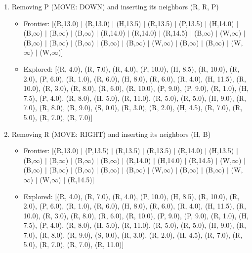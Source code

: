 \documentclass[12pt]{article}
\begin{document}
\begin{enumerate}
\item Removing P (MOVE: DOWN) and inserting its neighbors (R, R, P)
\begin{itemize}
\item Frontier: [(R,13.0) \(|\) (R,13.0) \(|\) (H,13.5) \(|\) (R,13.5) \(|\) (P,13.5) \(|\) (H,14.0) \(|\) (B,\(\infty\)) \(|\) (B,\(\infty\)) \(|\) (B,\(\infty\)) \(|\) (R,14.0) \(|\) (R,14.0) \(|\) (R,14.5) \(|\) (B,\(\infty\)) \(|\) (W,\(\infty\)) \(|\) (B,\(\infty\)) \(|\) (B,\(\infty\)) \(|\) (B,\(\infty\)) \(|\) (B,\(\infty\)) \(|\) (B,\(\infty\)) \(|\) (W,\(\infty\)) \(|\) (B,\(\infty\)) \(|\) (B,\(\infty\)) \(|\) (W,\(\infty\)) \(|\) (W,\(\infty\))]
\item Explored: [(R, 4.0), (R, 7.0), (R, 4.0), (P, 10.0), (H, 8.5), (R, 10.0), (R, 2.0), (P, 6.0), (R, 1.0), (R, 6.0), (H, 8.0), (R, 6.0), (R, 4.0), (H, 11.5), (R, 10.0), (R, 3.0), (R, 8.0), (R, 6.0), (R, 10.0), (P, 9.0), (P, 9.0), (R, 1.0), (H, 7.5), (P, 4.0), (R, 8.0), (H, 5.0), (R, 11.0), (R, 5.0), (R, 5.0), (H, 9.0), (R, 7.0), (R, 8.0), (R, 9.0), (S, 0.0), (R, 3.0), (R, 2.0), (H, 4.5), (R, 7.0), (R, 5.0), (R, 7.0), (R, 7.0)]
\end{itemize}

\item Removing R (MOVE: RIGHT) and inserting its neighbors (H, B)
\begin{itemize}
\item Frontier: [(R,13.0) \(|\) (P,13.5) \(|\) (R,13.5) \(|\) (R,13.5) \(|\) (R,14.0) \(|\) (H,13.5) \(|\) (B,\(\infty\)) \(|\) (B,\(\infty\)) \(|\) (B,\(\infty\)) \(|\) (B,\(\infty\)) \(|\) (R,14.0) \(|\) (H,14.0) \(|\) (R,14.5) \(|\) (W,\(\infty\)) \(|\) (B,\(\infty\)) \(|\) (B,\(\infty\)) \(|\) (B,\(\infty\)) \(|\) (B,\(\infty\)) \(|\) (B,\(\infty\)) \(|\) (W,\(\infty\)) \(|\) (B,\(\infty\)) \(|\) (B,\(\infty\)) \(|\) (W,\(\infty\)) \(|\) (W,\(\infty\)) \(|\) (R,14.5)]
\item Explored: [(R, 4.0), (R, 7.0), (R, 4.0), (P, 10.0), (H, 8.5), (R, 10.0), (R, 2.0), (P, 6.0), (R, 1.0), (R, 6.0), (H, 8.0), (R, 6.0), (R, 4.0), (H, 11.5), (R, 10.0), (R, 3.0), (R, 8.0), (R, 6.0), (R, 10.0), (P, 9.0), (P, 9.0), (R, 1.0), (H, 7.5), (P, 4.0), (R, 8.0), (H, 5.0), (R, 11.0), (R, 5.0), (R, 5.0), (H, 9.0), (R, 7.0), (R, 8.0), (R, 9.0), (S, 0.0), (R, 3.0), (R, 2.0), (H, 4.5), (R, 7.0), (R, 5.0), (R, 7.0), (R, 7.0), (R, 11.0)]
\end{itemize}


\end{enumerate}
\end{document}
